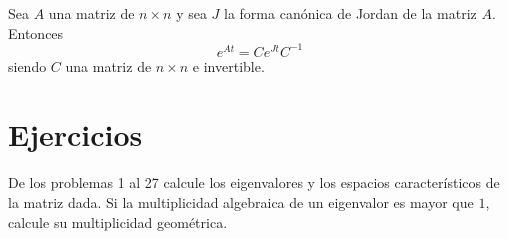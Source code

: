\newpage

\begin{theorem}
    Sea $A$ una matriz de $n \times n$ y sea $J$ la forma canónica de Jordan de la matriz $A$. Entonces
    $$e^{At} = Ce^{Jt}C^{-1}$$
    siendo $C$ una matriz de $n \times n$ e invertible.
\end{theorem}

\newpage

\section{Ejercicios}

\noindent
De los problemas 1 al 27 calcule los eigenvalores y los espacios característicos de la matriz dada. Si la multiplicidad algebraica de un eigenvalor es mayor que $1$, calcule su multiplicidad geométrica.
